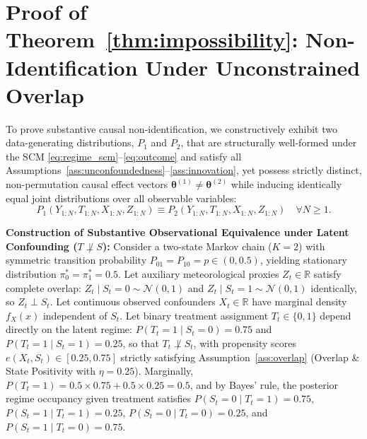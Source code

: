 \documentclass[twoside]{article}
\theoremstyle{definition}
\newcommand{\R}{\mathbb{R}}
\begin{document}
\vspace{-2mm}
\section{Proof of Theorem~\ref{thm:impossibility}: Non-Identification Under Unconstrained Overlap}
\label{app:proof_thm2}
To prove substantive causal non-identification, we constructively exhibit two data-generating distributions, $P_1$ and $P_2$, that are structurally well-formed under the SCM \eqref{eq:regime_scm}--\eqref{eq:outcome} and satisfy all Assumptions~\ref{ass:unconfoundedness}--\ref{ass:innovation}, yet possess strictly distinct, non-permutation causal effect vectors $\boldsymbol{\theta}^{(1)} \neq \boldsymbol{\theta}^{(2)}$ while inducing identically equal joint distributions over all observable variables:
\begin{equation}
    P_1(Y_{1:N}, T_{1:N}, X_{1:N}, Z_{1:N}) \equiv P_2(Y_{1:N}, T_{1:N}, X_{1:N}, Z_{1:N}) \quad \forall N \ge 1.
\end{equation}

\textbf{Construction of Substantive Observational Equivalence under Latent Confounding ($T \not\perp S$):}
Consider a two-state Markov chain ($K=2$) with symmetric transition probability $P_{01} = P_{10} = p \in (0, 0.5)$, yielding stationary distribution $\pi_0^* = \pi_1^* = 0.5$.
Let auxiliary meteorological proxies $Z_t \in \R$ satisfy complete overlap: $Z_t \mid S_t = 0 \sim \mathcal{N}(0, 1)$ and $Z_t \mid S_t = 1 \sim \mathcal{N}(0, 1)$ identically, so $Z_t \perp S_t$.
Let continuous observed confounders $X_t \in \R$ have marginal density $f_X(x)$ independent of $S_t$.
Let binary treatment assignment $T_t \in \{0, 1\}$ depend directly on the latent regime:
$P(T_t = 1 \mid S_t = 0) = 0.75$ and $P(T_t = 1 \mid S_t = 1) = 0.25$,
so that $T_t \not\perp S_t$, with propensity scores $e(X_t, S_t) \in [0.25, 0.75]$ strictly satisfying Assumption~\ref{ass:overlap} (Overlap \& State Positivity with $\eta = 0.25$).
Marginally, $P(T_t = 1) = 0.5 \times 0.75 + 0.5 \times 0.25 = 0.5$, and by Bayes' rule, the posterior regime occupancy given treatment satisfies $P(S_t = 0 \mid T_t = 1) = 0.75$, $P(S_t = 1 \mid T_t = 1) = 0.25$, $P(S_t = 0 \mid T_t = 0) = 0.25$, and $P(S_t = 1 \mid T_t = 0) = 0.75$.
\end{document}
